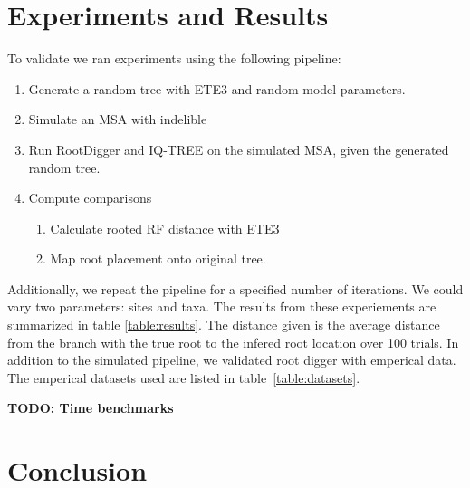 \documentclass{article}
\newcommand{\BenComment}[1]{{\bf \color{blue} {#1}}}
\begin{document}
\section{Experiments and Results}

To validate we ran experiments using the following pipeline:

\begin{enumerate}
  \item Generate a random tree with ETE3 \cite{huerta-cepas_ete_2016} and random
        model parameters.
  \item Simulate an MSA with indelible \cite{fletcher_indelible:_2009}
  \item Run RootDigger and IQ-TREE \cite{nguyen_iq-tree:_2015} on the simulated MSA, given the generated random tree.
  \item Compute comparisons
        \begin{enumerate}
          \item Calculate rooted RF distance with ETE3 \cite{robinson_comparison_1981}
          \item Map root placement onto original tree.
        \end{enumerate}
\end{enumerate}

Additionally, we repeat the pipeline for a specified number of iterations. We
could vary two parameters: sites and taxa. The results from these experiements
are summarized in table \ref{table:results}. The distance given is the average
distance from the branch with the true root to the infered root location over
100 trials. In addition to the simulated pipeline, we validated root digger with
emperical data. The emperical datasets used are listed in
table~\ref{table:datasets}.

\begin{table}
  \begin{center}
    
    \label{table:datasets}
  \end{center}
\end{table}

\begin{table}
  \begin{center}
    
    \label{table:results}
  \end{center}
\end{table}

\BenComment{TODO: Time benchmarks}

\section{Conclusion}
\end{document}
